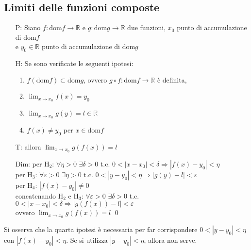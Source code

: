 \documentclass[a4paper]{article}
\newcommand\dom{\text{dom}}
\begin{document}
\subsection{Limiti delle funzioni composte}
\begin{itemize}
	\item[P:] Siano \(f: \dom f \to \mathbb{R}\) e \(g: \dom g \to \mathbb{R}\) due funzioni, 
	\(x_0\) punto di accumulazione di \(\dom f\) \\ e \(y_0 \in \mathbb{R}\) punto di accumulazione di \(\dom g\)
	\item[H:] Se sono verificate le seguenti ipotesi:
	\begin{enumerate}
		\item \(f(\dom f) \subset \dom g\), ovvero \(g \circ f : \dom f \to \mathbb{R}\) è definita,
		\item \(\displaystyle \lim_{x \to x_0} f(x) = y_0\)
		\item \(\displaystyle \lim_{x \to x_0} g(y) = l \in \mathbb{R}\)
		\item \(f(x) \neq y_0\) per \(x \in \dom f\)
	\end{enumerate}
	\item[T:] allora \(\displaystyle \lim_{x \to x_0} g(f(x)) = l\)
	\item[Dim:] per H\(_2\): \(\forall \eta > 0\) \(\exists \delta > 0\) t.c. \(0 < \left| x - x_0 \right| < \delta \Rightarrow \left| f(x) - y_0 \right| < \eta\) \\
	per H\(_3\): \(\forall \varepsilon > 0\) \(\exists \eta > 0\) t.c. \(0 < \left| y - y_0 \right| < \eta \Rightarrow \left| g(y) - l \right| < \varepsilon\) \\
	per H\(_4\): \(\left| f(x) - y_0 \right| \neq 0 \) \\
	concatenando H\(_2\) e H\(_3\): \(\forall \varepsilon > 0\) \(\exists \delta > 0\) t.c. \(0 < \left| x - x_0 \right| < \delta \Rightarrow \left| g(f(x)) - l \right| < \varepsilon\) \\
	ovvero \(\displaystyle \lim_{x \to x_0} g(f(x)) = l\) \qed
\end{itemize}

Si osserva che la quarta ipotesi è necessaria per far corrispondere \(0 < \left|y - y_0\right| < \eta\) con \(\left|f(x) - y_0\right| < \eta\).
Se si utilizza \(\left|y - y_0\right|<\eta\), allora non serve.
\end{document}
